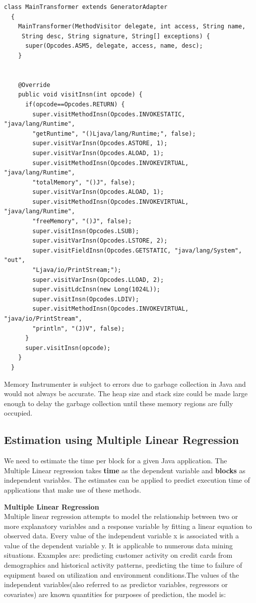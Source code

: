 \documentclass[11pt]{article}
\begin{document}
\begin{lstlisting}
class MainTransformer extends GeneratorAdapter
  {
    MainTransformer(MethodVisitor delegate, int access, String name,
     String desc, String signature, String[] exceptions) {
      super(Opcodes.ASM5, delegate, access, name, desc);
    }


    @Override
    public void visitInsn(int opcode) {
      if(opcode==Opcodes.RETURN) {
        super.visitMethodInsn(Opcodes.INVOKESTATIC, "java/lang/Runtime", 	
        "getRuntime", "()Ljava/lang/Runtime;", false);
        super.visitVarInsn(Opcodes.ASTORE, 1);
        super.visitVarInsn(Opcodes.ALOAD, 1);
        super.visitMethodInsn(Opcodes.INVOKEVIRTUAL, "java/lang/Runtime", 
        "totalMemory", "()J", false);
        super.visitVarInsn(Opcodes.ALOAD, 1);
        super.visitMethodInsn(Opcodes.INVOKEVIRTUAL, "java/lang/Runtime", 
        "freeMemory", "()J", false);
        super.visitInsn(Opcodes.LSUB);
        super.visitVarInsn(Opcodes.LSTORE, 2);
        super.visitFieldInsn(Opcodes.GETSTATIC, "java/lang/System", "out", 
        "Ljava/io/PrintStream;");
        super.visitVarInsn(Opcodes.LLOAD, 2);
        super.visitLdcInsn(new Long(1024L));
        super.visitInsn(Opcodes.LDIV);
        super.visitMethodInsn(Opcodes.INVOKEVIRTUAL, "java/io/PrintStream", 
        "println", "(J)V", false);
      }
      super.visitInsn(opcode);
    }
  }
\end{lstlisting}

Memory Instrumenter is subject to errors due to garbage collection in Java and would not always be accurate. The heap size and stack size could be made large enough to delay the garbage collection until these memory regions are fully occupied. 

\subsection{Estimation using Multiple Linear Regression}
We need to estimate the time per block for a given Java application. The Multiple Linear regression takes \textbf{time} as the dependent variable and \textbf{blocks} as independent variables. The estimates can be applied to predict execution time of applications that make use of these methods.\newline 

\textbf{Multiple Linear Regression}\\

Multiple linear regression attempts to model the relationship between two or more explanatory variables and a response variable by fitting a linear equation to observed data.\citep{linearreg} Every value of the independent variable x is associated with a value of the dependent variable y. It is applicable to numerous data mining situations. Examples are: predicting customer activity on credit cards from demographics and historical activity patterns, predicting the time to failure of equipment based on utilization and environment conditions.The values of the independent variables(also referred to as predictor variables, regressors or covariates) are known quantities for purposes of prediction, the model is:
\end{document}
